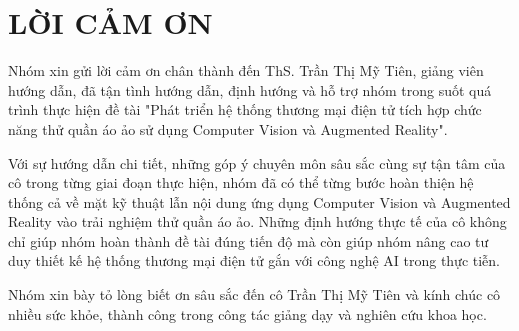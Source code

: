 \chapter*{LỜI CẢM ƠN}

Nhóm xin gửi lời cảm ơn chân thành đến ThS. Trần Thị Mỹ Tiên, giảng viên hướng dẫn, đã tận tình hướng dẫn, định hướng và hỗ trợ nhóm trong suốt quá trình thực hiện đề tài "Phát triển hệ thống thương mại điện tử tích hợp chức năng thử quần áo ảo sử dụng Computer Vision và Augmented Reality".

Với sự hướng dẫn chi tiết, những góp ý chuyên môn sâu sắc cùng sự tận tâm của cô trong từng giai đoạn thực hiện, nhóm đã có thể từng bước hoàn thiện hệ thống cả về mặt kỹ thuật lẫn nội dung ứng dụng Computer Vision và Augmented Reality vào trải nghiệm thử quần áo ảo. Những định hướng thực tế của cô không chỉ giúp nhóm hoàn thành đề tài đúng tiến độ mà còn giúp nhóm nâng cao tư duy thiết kế hệ thống thương mại điện tử gắn với công nghệ AI trong thực tiễn.

Nhóm xin bày tỏ lòng biết ơn sâu sắc đến cô Trần Thị Mỹ Tiên và kính chúc cô nhiều sức khỏe, thành công trong công tác giảng dạy và nghiên cứu khoa học.

\clearpage
